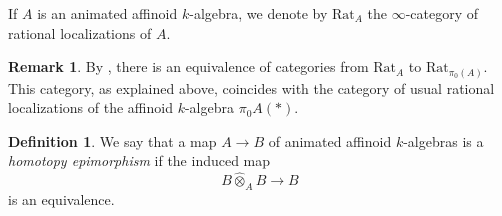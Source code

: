 \documentclass[oneside, hidelinks, 12pt, a4paper,reqno]{amsart}
\theoremstyle{plain}
\theoremstyle{definition}
\newtheorem{definition}[definition]{Definition}
\newtheorem{remark}[remark]{Remark}
\theoremstyle{plain}
\newcommand{\cat}{$\infty$-category }
\begin{document}
If $A$ is an animated affinoid $k$-algebra, we denote by $\mathrm{Rat}_{A}$ the \cat of rational localizations of $A$.

\begin{remark}\label{rmk: rational loc on pi0}
    By \cite[Proposition 2.29]{mikami2023fppfdescentcondensedanimatedrings}, there is an equivalence of categories from $\mathrm{Rat}_{A}$ to $\mathrm{Rat}_{\pi_{0}(A)}$. This category, as explained above, coincides with the category of usual rational localizations of the affinoid $k$-algebra $\pi_{0}A(\ast)$.
\end{remark}

\begin{definition}
    We say that a map $A \to B$ of animated affinoid $k$-algebras is a \emph{homotopy epimorphism} if the induced map
    \[
    B\widehat{\otimes}_{A}B \to B
    \]
    is an equivalence.
\end{definition}
\end{document}
